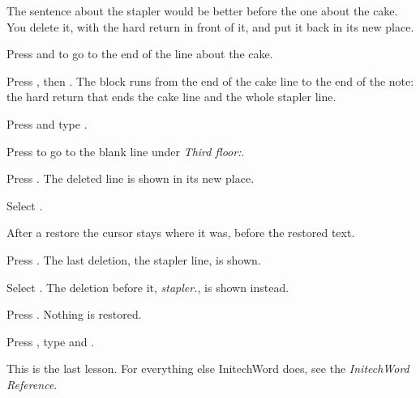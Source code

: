 The sentence about the stapler would be better before the one about the
cake.  You delete it, with the hard return in front of it, and put it back
in its new place.
\begin{WPSteps}
\item Press  and  to go to the end of the line
about the cake.
\item Press , then .  The
block runs from the end of the cake line to the end of the note: the hard
return that ends the cake line and the whole stapler line.
\item Press  and type .
\item Press  to go to the blank line under \textit{Third
floor:}.
\item Press .  The deleted line is shown in its new
place.
\end{WPSteps}
\begin{WPSteps}[resume]
\item Select .
\end{WPSteps}
After a restore the cursor stays where it was, before the restored text.

\begin{WPSteps}
\item Press .  The last deletion, the stapler line, is
shown.
\item Select .  The deletion before it,
\textit{stapler.}, is shown instead.
\item Press .  Nothing is restored.
\item Press , type  and .
\end{WPSteps}
\EndReplay
This is the last lesson.  For everything else InitechWord does, see the
\textit{InitechWord Reference}.
